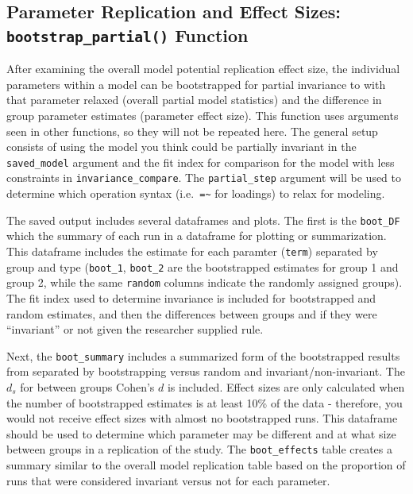 \documentclass[
  man,floatsintext]{apa7}
\begin{document}
\subsection{\texorpdfstring{Parameter Replication and Effect Sizes: \texttt{bootstrap\_partial()} Function}{Parameter Replication and Effect Sizes: bootstrap\_partial() Function}}\label{parameter-replication-and-effect-sizes-bootstrap_partial-function}

After examining the overall model potential replication effect size, the individual parameters within a model can be bootstrapped for partial invariance to with that parameter relaxed (overall partial model statistics) and the difference in group parameter estimates (parameter effect size). This function uses arguments seen in other functions, so they will not be repeated here. The general setup consists of using the model you think could be partially invariant in the \texttt{saved\_model} argument and the fit index for comparison for the model with less constraints in \texttt{invariance\_compare}. The \texttt{partial\_step} argument will be used to determine which operation syntax (i.e.~\texttt{=\textasciitilde{}} for loadings) to relax for modeling.

The saved output includes several dataframes and plots. The first is the \texttt{boot\_DF} which the summary of each run in a dataframe for plotting or summarization. This dataframe includes the estimate for each paramter (\texttt{term}) separated by group and type (\texttt{boot\_1}, \texttt{boot\_2} are the bootstrapped estimates for group 1 and group 2, while the same \texttt{random} columns indicate the randomly assigned groups). The fit index used to determine invariance is included for bootstrapped and random estimates, and then the differences between groups and if they were ``invariant'' or not given the researcher supplied rule.

Next, the \texttt{boot\_summary} includes a summarized form of the bootstrapped results from separated by bootstrapping versus random and invariant/non-invariant. The \(d_s\) for between groups Cohen's \(d\) is included. Effect sizes are only calculated when the number of bootstrapped estimates is at least 10\% of the data - therefore, you would not receive effect sizes with almost no bootstrapped runs. This dataframe should be used to determine which parameter may be different and at what size between groups in a replication of the study. The \texttt{boot\_effects} table creates a summary similar to the overall model replication table based on the proportion of runs that were considered invariant versus not for each parameter.
\end{document}

